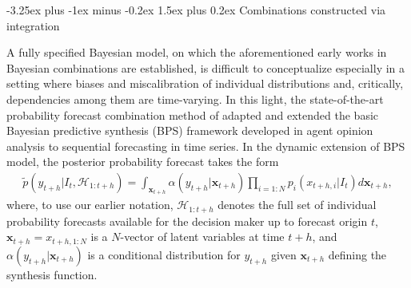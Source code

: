 \documentclass[11pt]{article}
\makeatletter
\renewcommand{\paragraph}{\@startsection{paragraph}{4}{0ex}%
   {-3.25ex plus -1ex minus -0.2ex}%
   {1.5ex plus 0.2ex}%
   {\normalfont\normalsize\bfseries}}
\makeatother
\begin{document}
\paragraph{Combinations constructed via integration}

A fully specified Bayesian model, on which the aforementioned early works in Bayesian combinations are established, is difficult to conceptualize especially in a setting where biases and miscalibration of individual distributions and, critically, dependencies among them are time-varying. In this light, the state-of-the-art probability forecast combination method of \cite{McAlinn2019-kn} adapted and extended the basic Bayesian predictive synthesis (BPS) framework developed in agent opinion analysis \citep[see, e.g.,][]{Genest1985-bu,West1992-qy,West1992-gr} to sequential forecasting in time series. In the dynamic extension of BPS model, the posterior probability forecast takes the form
\begin{align*}
\tilde{p}\left(y_{t+h} | I_{t}, \mathcal{H}_{1: t+h}\right) = \int_{\boldsymbol{x}_{t+h}} \alpha\left(y_{t+h} | \boldsymbol{x}_{t+h}\right) \prod_{i=1: N} p_{i}\left(x_{t+h,i}|I_{t}\right) d \boldsymbol{x}_{t+h},
\end{align*}
where, to use our earlier notation, $\mathcal{H}_{1: t+h}$ denotes the full set of individual probability forecasts available for the decision maker up to forecast origin $t$, $\boldsymbol{x}_{t+h} = x_{t+h, 1:N}$ is a $N$-vector of latent variables at time $t+h$, and $\alpha\left(y_{t+h} | \boldsymbol{x}_{t+h}\right)$ is a conditional distribution for $y_{t+h}$ given $\boldsymbol{x}_{t+h}$ defining the synthesis function.
\end{document}
